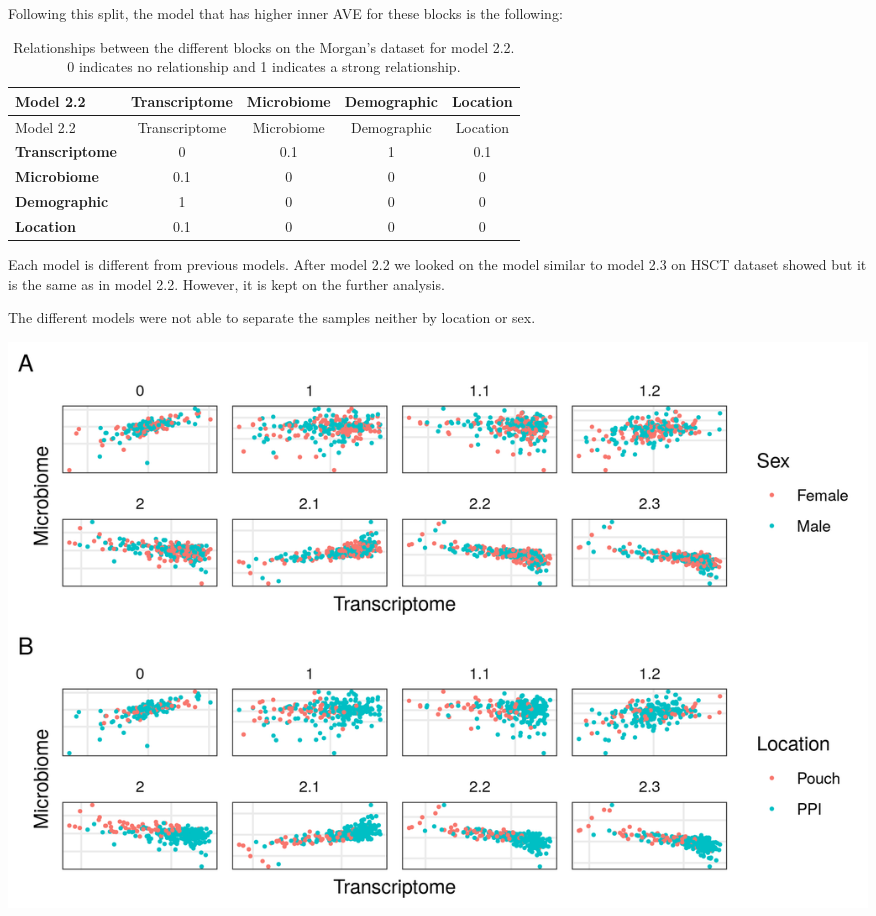 \documentclass[
  a4paper,
]{book}
\let\origfigure\figure
\let\endorigfigure\endfigure
\renewenvironment{figure}[1][2] {
    \expandafter\origfigure\expandafter[!ht]
} {
    \endorigfigure
}
\begin{document}
Following this split, the model that has higher inner AVE for these blocks is the following:

\begin{longtable}[]{@{}lcccc@{}}
\caption{\label{tab:morgan-model2-2} Relationships between the different blocks on the Morgan's dataset for model 2.2. 0 indicates no relationship and 1 indicates a strong relationship.}\tabularnewline
\toprule
Model 2.2 & Transcriptome & Microbiome & Demographic & Location \\
\midrule
\endfirsthead
\toprule
Model 2.2 & Transcriptome & Microbiome & Demographic & Location \\
\midrule
\endhead
\textbf{Transcriptome} & 0 & 0.1 & 1 & 0.1 \\
\textbf{Microbiome} & 0.1 & 0 & 0 & 0 \\
\textbf{Demographic} & 1 & 0 & 0 & 0 \\
\textbf{Location} & 0.1 & 0 & 0 & 0 \\
\bottomrule
\end{longtable}

Each model is different from previous models.
After model 2.2 we looked on the model similar to model 2.3 on HSCT dataset showed but it is the same as in model 2.2.
However, it is kept on the further analysis.

The different models were not able to separate the samples neither by location or sex.

\begin{figure}
\centering
\includegraphics{images/morgan_models.png}
\caption{\label{fig:morgan-models} First component of the transcriptome and microbiome of the Morgan's dataset.Model 0 without sample data. Model 1 to 1.2 with all the sample data in a single block and models 2.1 to 2.3 with sample data in several blocks. Panel A shows samples colored by sex and panel B by segment of the sample. There is no clear classification neither by location nor sex on any of the models.}
\end{figure}
\end{document}
